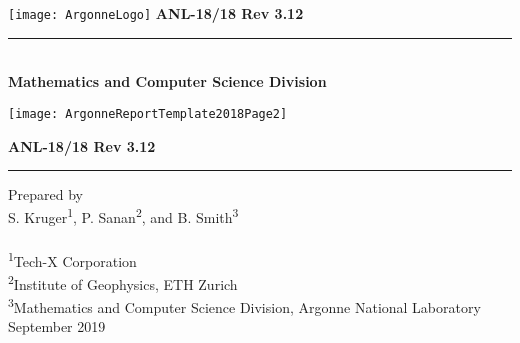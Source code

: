 
%



\def\shortintro{false}

\usepackage{fancyhdr,lastpage}
\pagestyle{fancy}



\pagestyle{empty}
\hspace{-.65in}\texttt{[image: ArgonneLogo]}
\hfill  {\large {\bf ANL-18/18 Rev 3.12}}

\vspace*{2in}
\vspace*{8pt}
\hrule
\vspace*{8pt}

\vspace*{1in}
\noindent \\
{\Large {\bf Mathematics and Computer Science Division}}

\vspace*{10pt}
\vspace*{20pt}



\newpage
\centerline{\texttt{[image: ArgonneReportTemplate2018Page2]}}
\newpage

\hfill {\large {\bf ANL-18/18 Rev 3.12}}

\vspace*{2in}
\vspace*{8pt}
\hrule
\vspace*{8pt}

\vspace*{0.5in}
\noindent Prepared by \\
{S. Kruger\textsuperscript{1}, P. Sanan\textsuperscript{2}, and B. Smith\textsuperscript{3}}\\
\\
\textsuperscript{1}Tech-X Corporation \\
\textsuperscript{2}Institute of Geophysics, ETH Zurich\\
\textsuperscript{3}Mathematics and Computer Science Division, Argonne National Laboratory \\

\vspace*{30pt}
\noindent September 2019

